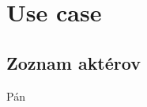 \section{Use case}

\subsection{Zoznam aktérov}

\begin{description}
    \item[Pán]
\end{description}

